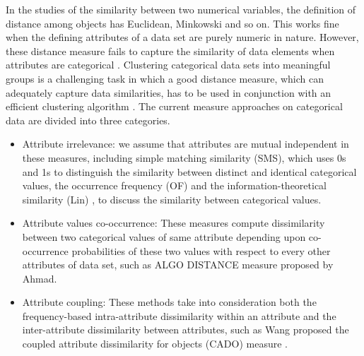 \documentclass[review]{elsarticle}
\begin{document}
In the studies of the similarity between two numerical variables, the definition of distance among objects has Euclidean, Minkowski and so on. This works fine when the defining attributes of a data set are purely numeric in nature. However, these distance measure fails to capture the similarity of data elements when attributes are categorical \cite{Ahmad2007KMean}. Clustering categorical data sets into meaningful groups is a challenging task in which a good distance measure, which can adequately capture data similarities, has to be used in conjunction with an efficient clustering algorithm \cite{Ahmad2007KMean}. The current measure approaches on categorical data are divided into three categories.
\begin{itemize}
  \item Attribute irrelevance: we assume that attributes are mutual independent in these measures, including simple matching similarity (SMS), which uses 0s and 1s to distinguish the similarity between distinct and identical categorical values, the occurrence frequency (OF) \cite{Boriah2008Similarity} and the information-theoretical similarity (Lin) \cite{Boriah2008Similarity}, to discuss the similarity between categorical values.
  \item Attribute values co-occurrence: These measures compute dissimilarity between two categorical values of same attribute depending upon co-occurrence probabilities of these two values with respect to every other attributes of data set, such as ALGO DISTANCE measure \cite{Ahmad2007Method} proposed by Ahmad.
  \item Attribute coupling: These methods take into consideration both the frequency-based intra-attribute dissimilarity within an attribute and the inter-attribute dissimilarity between attributes, such as Wang proposed the coupled attribute dissimilarity for objects (CADO) measure \cite{Wang2015Coupled}.
 \end{itemize}
\end{document}
